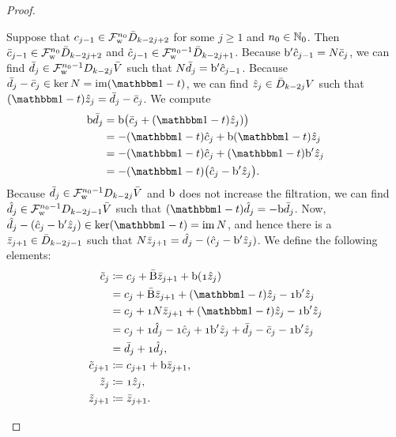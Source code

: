 \documentclass[\MainFolder/Text.tex]{subfiles}
\begin{document}
\begin{proof}
\begin{ProofList}
Suppose that $c_{j-1} \in \mathcal{F}^{n_0}_{\mathrm{w}} \bar{D}_{k-2 j + 2}$ for some $j\ge 1$ and $n_0\in \mathbb{N}_0$. Then $\bar{c}_{j-1}\in\mathcal{F}^{n_0}_{\mathrm{w}}\bar{D}_{k-2 j + 2}$ and $\hat{c}_{j-1}\in \mathcal{F}^{n_0-1}_{\mathrm{w}}\bar{D}_{k-2j+1}$. Because $\mathrm{b}'\hat{c}_{j-1} = N \bar{c}_j$, we can find $\bar{d}_{j} \in \mathcal{F}^{n_0-1}_{\mathrm{w}} D_{k-2j}\bar{V}$ such that $N \bar{d}_{j} = \mathrm{b}' \hat{c}_{j-1}$. Because $\bar{d}_j - \bar{c}_j \in \ker \CountOp = \im (\Id-\CycPermOp)$, we can find $\hat{z}_j \in \bar{D}_{k-2j}V$ such that $(\Id-\CycPermOp)\hat{z}_j = \bar{d}_{j} - \bar{c}_{j}$. We compute
\begin{align*}
 \Hd \bar{d}_j & = \Hd \bigl( \bar{c}_j + (\Id-\CycPermOp)\hat{z}_j)\bigr) \\
 & = - (\Id-\CycPermOp)\hat{c}_j + \Hd (\Id-\CycPermOp)\hat{z}_j \\
 & = - (\Id-\CycPermOp)\hat{c}_j + (\Id-\CycPermOp) \Hd' \hat{z}_j \\
 & = - (\Id-\CycPermOp)\bigl(\hat{c}_j - \Hd'\hat{z}_j\bigr).
\end{align*}
Because $\bar{d}_j \in \mathcal{F}^{n_0-1}_{\mathrm{w}}D_{k-2j}\bar{V}$ and $\mathrm{b}$ does not increase the filtration, we can find $\hat{d}_j \in \mathcal{F}^{n_0-1}_{\mathrm{w}}D_{k-2j-1}\bar{V}$ such that $(\Id-\CycPermOp)\hat{d}_j = - \Hd \bar{d}_j$. Now, $\hat{d}_j - (\hat{c}_j - \Hd'\hat{z}_j) \in \ker (\Id-\CycPermOp) = \im \CountOp$, and hence there is a $\bar{z}_{j+1}\in \bar{D}_{k-2j-1}$ such that $N \bar{z}_{j+1} = \hat{d}_j - (\hat{c}_j - \mathrm{b}'\hat{z}_j)$. We define the following elements:
\begin{align*}
 \tilde{c}_j &\coloneqq c_j + \NCd \bar{z}_{j+1} + \Hd(\NOne \hat{z}_j) \\
 & = c_j + \NCd \bar{z}_{j+1} + (\Id-\CycPermOp)\hat{z}_j - \NOne \Hd'\hat{z}_j \\
 & = c_j + \NOne \CountOp \bar{z}_{j+1} + (\Id-\CycPermOp)\hat{z}_j - \NOne\Hd'\hat{z}_j \\
 & =  c_j + \NOne \hat{d}_j -\NOne \hat{c}_j + \NOne \Hd'\hat{z}_j + \bar{d}_j - \bar{c}_j - \NOne\Hd'\hat{z}_j\\
 & = \bar{d}_j + \NOne \hat{d}_j, \\
 \tilde{c}_{j+1} & \coloneqq c_{j+1} + \Hd \bar{z}_{j+1}, \\
 \tilde{z}_j & \coloneqq \NOne \hat{z}_j, \\
 \tilde{z}_{j+1} &\coloneqq \bar{z}_{j+1}.

\end{align*}
\end{ProofList}
\end{proof}
\end{document}
